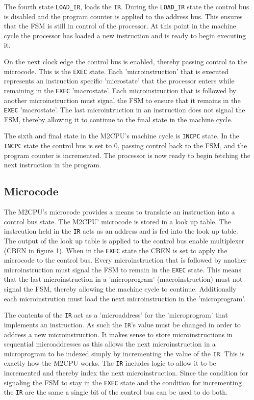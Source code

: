 \documentclass[a4paper,12pt]{article}
\newcommand{\mt}{M2CPU}
\newcommand{\IR}{\texttt{IR}}
\newcommand{\Lo}{\texttt{LOAD\_IR}}
\newcommand{\Ex}{\texttt{EXEC}}
\newcommand{\In}{\texttt{INCPC}}
\begin{document}
The fourth state \Lo{}, loads the \IR{}. During the \Lo{} state the control bus
is disabled and the program counter is applied to the address bus. This ensures
that the FSM is still in control of the processor. At this point in the machine
cycle the processor has loaded a new instruction and is ready to begin 
executing it. 
\par

On the next clock edge the control bus is enabled, thereby passing control to
the microcode. This is the \Ex{} state. Each 'microinstruction' that is 
executed represents an instruction specific 'microstate' that the processor
enters while remaining in the \Ex{} 'macrostate'. Each microinstruction that is
followed by another microinstruction must signal the FSM to ensure that it 
remains in the \Ex{} 'macrostate'. The last microintruction in an instruction 
does not signal the FSM, thereby allowing it to continue to the final state in
the machine cycle.
\par

The sixth and final state in the \mt{}'s machine cycle is \In{} state. In the 
\In{} state the control bus is set to 0, passing control back to the FSM, and 
the program counter is incremented. The processor is now ready to begin 
fetching the next instruction in the program.
\par

\subsection{Microcode}
The \mt{}'s microcode provides a means to translate an instruction into a 
control bus state. The \mt{}' microcode is stored in a look up table. The
instrcution held in the \IR{} acts as an address and is fed into the look up
table. The output of the look up table is applied to the control bus enable
multiplexer (CBEN in figure 1). When in the \Ex{} state the CBEN is set to
apply the microcode to the control bus. Every microinstruction that is followed
by another microinstruction must signal the FSM to remain in the \Ex{} state.
This means that the last microinstruction in a 'microprogram' 
(macroinstruction) must not signal the FSM, thereby allowing the machine cycle
to continue. Additionally each microinstrution must load the next 
microinstruction in the 'microprogram'.
\par

The contents of the \IR{} act as a 'microaddress' for the 'microprogram' that
implements an instruction. As such the \IR{}'s value must be changed in order
to address a new microinstruction. It makes sense to store microinstructions
in sequential microaddresses as this allows the next microinstruction in a
microprogram to be indexed simply by incrementing the value of the \IR{}. This
is exactly how the \mt{} works. The \IR{} includes logic to allow it to be 
incremented and thereby index the next microinstruction. Since the condition
for signaling the FSM to stay in the \Ex{} state and the condition for
incrementing the \IR{} are the same a single bit of the control bus can be used
to do both.
\par
\end{document}
